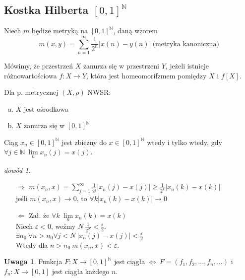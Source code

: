 \documentclass[twoside,10pt]{article}
\theoremstyle{definition}
\theoremstyle{definition}
\theoremstyle{definition}
\theoremstyle{definition}
\theoremstyle{remark}
\newtheorem*{dd}{dowód}
\theoremstyle{definition}
\newtheorem*{uw}{Uwaga}
\theoremstyle{definition}
\theoremstyle{definition}
\theoremstyle{definition}
\theoremstyle{definition}
\theoremstyle{definition}
\begin{document}
\subsection{Kostka Hilberta $[0,1]^\mathbb{N}$}
    Niech $m$ będize metryką na $[0,1]^\mathbb{N}$, daną wzorem 
    \[ m(x,y) = \sum_{n=1}^\infty \frac{1}{2^n} |x(n) - y(n)| \ \text{(metryka kanoniczna)}\]
\begin{df} 
    Mówimy, że przestrzeń $X$ zanurza się w przestrzeni $Y$, jeżeli istnieje różnowartościowa
    $f: X \to Y$, która jest homeomorifzmem pomiędzy $X$ i $f[X]$.
\end{df} 
\begin{tw} 
    Dla p. metrycznej $(X,\rho)$ NWSR: 
    \begin{enumerate}[(a)]
        \item $X$ jest ośrodkowa 
        \item $X$ zanurza się w $[0,1]^\mathbb{N}$
    \end{enumerate} 
\end{tw} 
\begin{lem} 
    Ciąg $x_n \in [0,1]^\mathbb{N}$ jest zbieżny do $x \in [0,1]^\mathbb{N}$ wtedy i tylko wtedy, gdy 
    $\forall j \in \mathbb{N} \ \lim\limits_{n} x_n(j) = x(j)$.
    \begin{dd} \hfill 
        \begin{itemize} 
            \item[$\Rightarrow$] $m(x_n,x) = \sum\limits_{j=1}^\infty \frac{1}{2^j} |x_n(j) - x(j)| 
                    \ge \frac{1}{2^k} |x_n(k) - x(k)|$ \\ 
                    jeśli $m(x_n,x) \to 0$, to $ \forall k |x_n (k) - x(k)| \to 0$
                \item[$\Leftarrow$] Zał. że $\forall k \ \lim\limits_n x_n (k) = x(k)$ \\ 
                    Niech $\varepsilon < 0$, weźmy $N \ \frac{1}{2^N} < \frac{\varepsilon}{2}$. \\ 
                    $\exists n_0 \ \forall n > n_0 \forall j < N \ |x_n(j) - x(j)| < \frac{\varepsilon}{2}$ \\ 
                    Wtedy dla $n > n_0 \ m(x_n,x) < \varepsilon$.
        \end{itemize} 
    \end{dd} 
\end{lem}
\begin{uw} 
    Funkcja $F: X \to [0,1]^\mathbb{N}$ jest ciągła $\Leftrightarrow \ F=(f_1,f_2,\ldots,f_n,\ldots)$ i 
    $f_n : X \to [0,1]$ jest ciągła każdego $n$.
\end{uw} 
\end{document}
